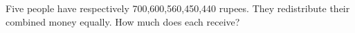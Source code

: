 Five people have respectively 700,600,560,450,440 rupees. They redistribute their combined money equally. How much does each receive?
